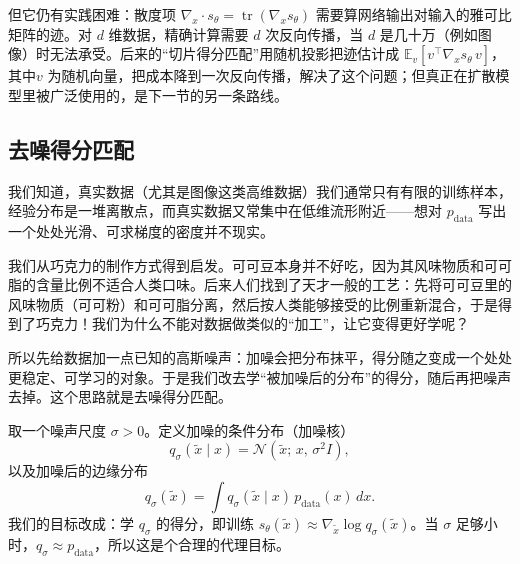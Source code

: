但它仍有实践困难：散度项 $\nabla_x \cdot s_\theta = \operatorname{tr}(\nabla_x s_\theta)$ 需要算网络输出对输入的雅可比矩阵的迹。对 $d$ 维数据，精确计算需要 $d$ 次反向传播，当 $d$ 是几十万（例如图像）时无法承受。后来的“切片得分匹配”\cite{song2020generativemodelingestimatinggradients}用随机投影把迹估计成 $\mathbb{E}_v[v^\top \nabla_x s_\theta\, v]$，其中$v$ 为随机向量，把成本降到一次反向传播，解决了这个问题；但真正在扩散模型里被广泛使用的，是下一节的另一条路线。

\subsection{去噪得分匹配}

我们知道，真实数据（尤其是图像这类高维数据）我们通常只有有限的训练样本，经验分布是一堆离散点，而真实数据又常集中在低维流形附近——想对 $p_{\text{data}}$ 写出一个处处光滑、可求梯度的密度并不现实。

我们从巧克力的制作方式得到启发。可可豆本身并不好吃，因为其风味物质和可可脂的含量比例不适合人类口味。后来人们找到了天才一般的工艺：先将可可豆里的风味物质（可可粉）和可可脂分离，然后按人类能够接受的比例重新混合，于是得到了巧克力！我们为什么不能对数据做类似的“加工”，让它变得更好学呢？

所以先给数据加一点已知的高斯噪声：加噪会把分布抹平，得分随之变成一个处处更稳定、可学习的对象。于是我们改去学“被加噪后的分布”的得分，随后再把噪声去掉。这个思路就是去噪得分匹配\textcite{vincent2011connection}。

取一个噪声尺度 $\sigma > 0$。定义加噪的条件分布（加噪核）
\begin{equation}
q_\sigma(\tilde{x} \mid x) = \mathcal{N}(\tilde{x};\, x,\, \sigma^2 I),
\end{equation}
以及加噪后的边缘分布
\begin{equation}
q_\sigma(\tilde{x}) = \int q_\sigma(\tilde{x}\mid x)\, p_{\text{data}}(x)\, dx.
\end{equation}
我们的目标改成：学 $q_\sigma$ 的得分，即训练 $s_\theta(\tilde x) \approx \nabla_{\tilde x}\log q_\sigma(\tilde x)$。当 $\sigma$ 足够小时，$q_\sigma \approx p_{\text{data}}$，所以这是个合理的代理目标。

